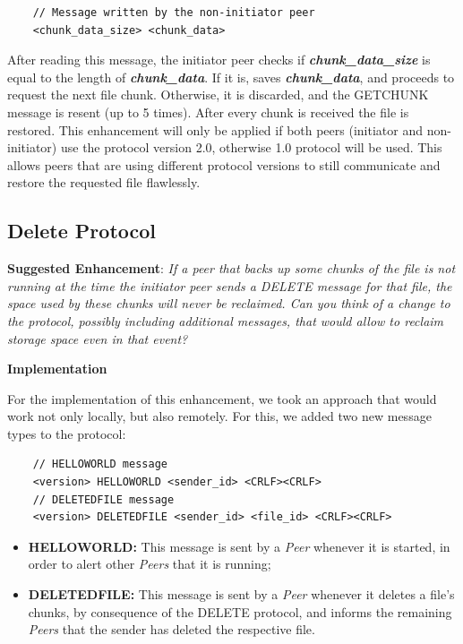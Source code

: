 \documentclass[a4paper]{article}
\begin{document}
\begin{lstlisting}
    // Message written by the non-initiator peer   
    <chunk_data_size> <chunk_data>
\end{lstlisting}

After reading this message, the initiator peer checks if \textbf{\textit{chunk\_data\_size}} is 
equal to the length of \textbf{\textit{chunk\_data}}. If it is, saves 
\textbf{\textit{chunk\_data}}, and proceeds to request the next file chunk. Otherwise, it is 
discarded, and the GETCHUNK message is resent (up to 5 times). After every chunk is received the 
file is restored. This enhancement will only be applied if both peers (initiator and 
non-initiator) use the protocol version 2.0, otherwise 1.0 protocol will be used. This allows 
peers that are using different protocol versions to still communicate and restore the requested 
file flawlessly.

\newpage
\subsection{Delete Protocol}

\textbf{Suggested Enhancement}:
\textit{If a peer that backs up some chunks of the file is not running at the time the initiator peer sends a DELETE message
for that file, the space used by these chunks will never be reclaimed. Can you think of a change to the protocol, possibly
including additional messages, that would allow to reclaim storage space even in that event?}

\bigskip\textbf{Implementation}

For the implementation of this enhancement, we took an approach that would work not only locally, but also remotely. For
this, we added two new message types to the protocol:
\begin{lstlisting}
    // HELLOWORLD message
    <version> HELLOWORLD <sender_id> <CRLF><CRLF>
    // DELETEDFILE message
    <version> DELETEDFILE <sender_id> <file_id> <CRLF><CRLF>
\end{lstlisting}

\begin{itemize}
    \item \textbf{HELLOWORLD:} This message is sent by a \textit{Peer} whenever it is started, in order to alert other \textit{Peers} that it is running;
    \item \textbf{DELETEDFILE:} This message is sent by a \textit{Peer} whenever it deletes a 
    file's chunks, by consequence of the DELETE protocol, and informs the remaining 
    \textit{Peers} that the sender has deleted the respective file.
\end{itemize}
\end{document}

